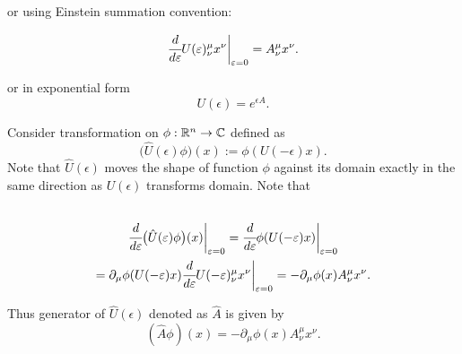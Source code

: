 \documentclass[main.tex]{subfiles}
\begin{document}
or using Einstein summation convention:

\begin{equation}
\cfrac{d}{d\epsilon} U(\epsilon)^\mu_\nu x^\nu \bigg|_{\epsilon=0} = A^\mu_\nu x^\nu.
\end{equation}

or in exponential form 
\begin{equation}
U(\epsilon) = e^{\epsilon A}.
\end{equation}

Consider transformation on $\phi: \R^n\to\C$ defined as
\begin{equation}
\big(\hat{U}(\epsilon)\phi\big)(x) := \phi(U(-\epsilon)x).
\end{equation}
Note that $\hat{U}(\epsilon)$ moves the shape of function $\phi$ against its domain exactly in the same direction as $U(\epsilon)$ transforms domain.
Note that
\begin{multline}\\
\cfrac{d}{d\epsilon} \big(\hat{U}(\epsilon)\phi\big)(x) \bigg|_{\epsilon=0} =
 \cfrac{d}{d\epsilon} \phi(U(-\epsilon)x) \bigg|_{\epsilon=0}\\
 = \partial_\mu \phi(U(-\epsilon)x) \cfrac{d}{d\epsilon} U(-\epsilon)^\mu_\nu x^\nu \bigg|_{\epsilon=0}
 = - \partial_\mu \phi(x) A^\mu_\nu x^\nu.
 \\
\end{multline}

Thus generator of $\hat{U}(\epsilon)$ denoted as $\hat{A}$ is given by
\begin{equation}
(\hat{A}\phi)(x) = - \partial_\mu \phi(x) A^\mu_\nu x^\nu.
\end{equation}
\end{document}
